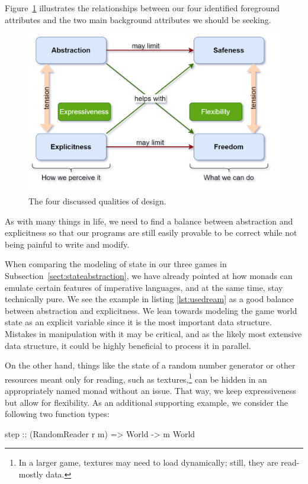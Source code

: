 \documentclass[
  digital, %
  color,   %
  table,   %
  oneside, %
  lof,     %
  lot,     %
]{fithesis3}
\begin{document}
{Figure~\ref{fig:4sides} illustrates the relationships between our four identified
foreground attributes and the two main background attributes we should be seeking.
\begin{figure}
    \centering
    \includegraphics[width=\textwidth]{images/4sides-of-code.png}
    \caption{The four discussed qualities of design.}
    \label{fig:4sides}
\end{figure}

As with many things in life, we need to find a balance
between abstraction and explicitness so that our programs are still
easily provable to be correct while not being painful to write and modify.

When comparing the modeling of state in our three games in Subsection~\ref{sect:stateabstraction},
we have already pointed at how monads can emulate certain features of imperative languages,
and at the same time, stay technically pure.\footnotemark{} We see the example in listing
\ref{lst:usedream} as a good balance between abstraction and explicitness.
We lean towards modeling the game world state as an explicit variable since it is
the most important data structure. Mistakes in manipulation with it may be critical,
and as the likely most extensive data structure,
it could be highly beneficial to process it in parallel.


On the other hand, things like the state of a random number generator or other resources
meant only for reading, such as textures,\footnote{
In a larger game, textures may need to load dynamically; still, they are read-mostly data.
}
can be hidden in an appropriately named monad without an issue.
That way, we keep expressiveness but allow for flexibility.
As an additional supporting example, we consider the following two function types:
\begin{haskell}
step :: (RandomReader r m) => World -> m World


\end{haskell}}
\end{document}
